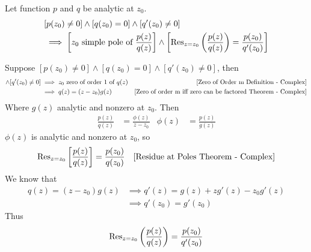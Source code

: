 \documentclass[12pt, english]{book}
\makeatletter
\renewenvironment{proof}[1][\proofname]{\par
	\pushQED{\qed}%
	\normalfont \topsep6\p@\@plus6\p@\relax
	\list{}{%
		\settowidth{\leftmargin}{\itshape\proofname:\hskip\labelsep}%
		\setlength{\labelwidth}{0pt}%
		\setlength{\itemindent}{-\leftmargin}%
	}%
	\item[\hskip\labelsep\itshape#1\@addpunct{:}]\ignorespaces
}{%
	\popQED\endlist\@endpefalse
}
\makeatother
\begin{document}
	\begin{theorem}
		\label{Residue of Simple Pole Theorem - Complex}
		Let function \(p\) and \(q\) be analytic at \(z_0\).
		\begin{align*}
			&[p(z_0) \neq 0] \land [q(z_0) = 0] \land [q'(z_0) \neq 0] \\
			&\implies \left[z_0 \text{ simple pole of } \frac{p(z)}{q(z)}\right] \land \left[\Res_{z=z_0}\left(\frac{p(z)}{q(z)}\right) = \frac{p(z_0)}{q'(z_0)} \right]
		\end{align*}
	\end{theorem}
	\begin{proof}
		Suppose \([p(z_0) \neq 0] \land [q(z_0) = 0] \land [q'(z_0) \neq 0]\), then 
		\begin{align*}
			[q(z_0) = 0] \land [q'(z_0) \neq 0]
			&\implies z_0 \text{ zero of order } 1 \text{ of } q(z)
				& \text{\Cref{Zero of Order m Definition - Complex}} \\
			&\implies q(z) = (z-z_0)g(z)
				& \text{\Cref{Zero of order m iff zero can be factored Theorem - Complex}}
		\end{align*}
		Where \(g(z)\) analytic and nonzero at \(z_0\). Then 
		\begin{align*}
			\frac{p(z)}{q(z)} &= \frac{\phi(z)}{z-z_0} & \phi(z) &= \frac{p(z)}{g(z)}
		\end{align*}
		\(\phi(z)\) is analytic and nonzero at \(z_0\), so
		\begin{align*}
			\Res_{z=z_0}\left[\frac{p(z)}{q(z)}\right] &= \frac{p(z_0)}{q(z_0)} 
				& \text{\Cref{Residue at Poles Theorem - Complex}}
		\end{align*}
		We know that 
		\begin{align*}
			q(z) = (z-z_0) g(z)
			&\implies q'(z) = g(z) + zg'(z) - z_0 g'(z) \\
			&\implies q'(z_0) = g'(z_0)
		\end{align*}
		Thus 
		\begin{align*}
			\Res_{z=z_0}\left(\frac{p(z)}{q(z)}\right) = \frac{p(z_0)}{q'(z_0)}
		\end{align*}
	\end{proof}
	
\end{document}
